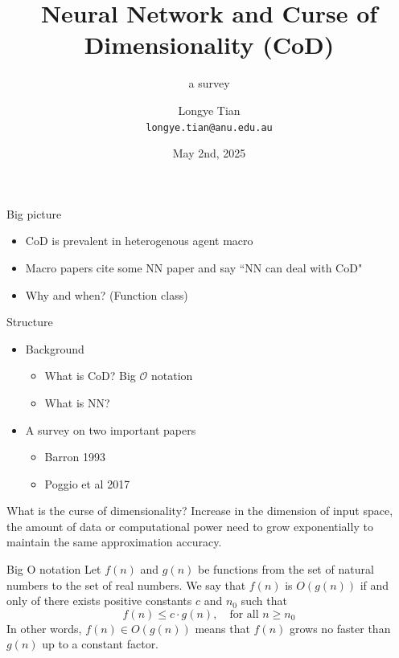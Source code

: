 \documentclass[aspectratio=169]{beamer} %
\title[NN]{Neural Network and Curse of Dimensionality (CoD)}
\subtitle{a survey}
\author[Longye]{Longye Tian \\ \texttt{longye.tian@anu.edu.au}}
\institute[ANU]{Australian National University\\ School of Economics}
\date{May 2nd, 2025}
\begin{document}
\begin{frame}
  \titlepage
\end{frame}

\begin{frame}{Big picture}
\begin{itemize}
    \item CoD is prevalent in heterogenous agent macro
    \item Macro papers cite some NN paper and say ``NN can deal with CoD"
    \item Why and when? (Function class)
\end{itemize}

\end{frame}

\begin{frame}{Structure}
\begin{itemize}
    \item Background
    \begin{itemize}
        \item What is CoD? Big $\mathcal{O}$ notation
        \item What is NN?
    \end{itemize}
    \item A survey on two important papers
    \begin{itemize}
        \item Barron 1993
        \item Poggio et al 2017
    \end{itemize}
\end{itemize}
    
\end{frame}

\begin{frame}{What is the curse of dimensionality?}
    Increase in the dimension of input space, the amount of data or computational power need to grow exponentially to maintain the same approximation accuracy. 
\end{frame}

\begin{frame}{Big O notation}
Let $f(n)$ and $g(n)$ be functions from the set of natural numbers to the set of real numbers. We say that $f(n)$ is $O(g(n))$ if and only of there exists positive constants $c$ and $n_0$ such that
$$
f(n) \le c\cdot g(n),\quad\text{for all $n\ge n_0$}
$$
In other words, $f(n) \in O(g(n))$ means that $f(n)$ grows no faster than $g(n)$ up to a constant factor. 
\end{frame}
\end{document}
